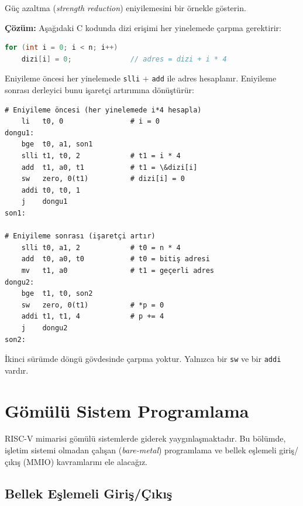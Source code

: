 \begin{ornek}[4.17]
\label{orn:guc-azaltma}
Güç azaltma (\emph{strength reduction}) eniyilemesini bir örnekle gösterin.

\textbf{Çözüm:} Aşağıdaki C kodunda dizi erişimi her yinelemede çarpma gerektirir:

\begin{lstlisting}[language=C, style=alistirma-kod]
for (int i = 0; i < n; i++)
    dizi[i] = 0;              // adres = dizi + i * 4
\end{lstlisting}

Eniyileme öncesi her yinelemede \texttt{slli} + \texttt{add} ile adres hesaplanır. Eniyileme sonrası derleyici bunu işaretçi artırımına dönüştürür:

\begin{lstlisting}[style=riscv]
# Eniyileme öncesi (her yinelemede i*4 hesapla)
    li   t0, 0                # i = 0
dongu1:
    bge  t0, a1, son1
    slli t1, t0, 2            # t1 = i * 4
    add  t1, a0, t1           # t1 = \&dizi[i]
    sw   zero, 0(t1)          # dizi[i] = 0
    addi t0, t0, 1
    j    dongu1
son1:

# Eniyileme sonrası (işaretçi artır)
    slli t0, a1, 2            # t0 = n * 4
    add  t0, a0, t0           # t0 = bitiş adresi
    mv   t1, a0               # t1 = geçerli adres
dongu2:
    bge  t1, t0, son2
    sw   zero, 0(t1)          # *p = 0
    addi t1, t1, 4            # p += 4
    j    dongu2
son2:
\end{lstlisting}

İkinci sürümde döngü gövdesinde çarpma yoktur. Yalnızca bir \texttt{sw} ve bir \texttt{addi} vardır.
\end{ornek}


\section{Gömülü Sistem Programlama}
\label{sec:gomulu-sistem}

RISC-V mimarisi gömülü sistemlerde giderek yaygınlaşmaktadır. Bu bölümde, işletim sistemi olmadan çalışan (\emph{bare-metal}) programlama ve bellek eşlemeli giriş/çıkış (MMIO) kavramlarını ele alacağız.

\subsection{Bellek Eşlemeli Giriş/Çıkış}
\label{subsec:mmio}

